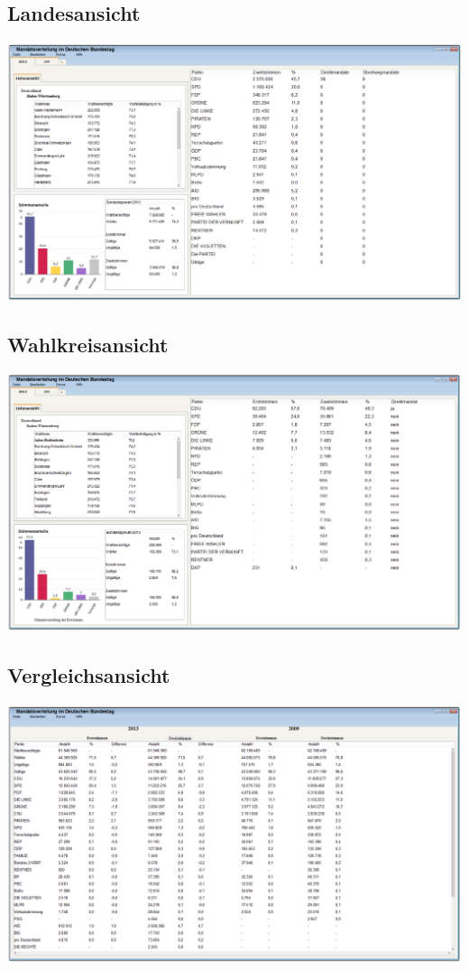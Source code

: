\documentclass[10pt,a4paper]{article}
\begin{document}
\subsection{Landesansicht}
\includegraphics[scale=0.3]{Landesansicht.png}
\newpage
\subsection{Wahlkreisansicht}
\includegraphics[scale=0.3]{Wahlkreisansicht.png}
\newpage
\subsection{Vergleichsansicht}
\includegraphics[scale=0.3]{Vergleichsansicht.png}
\newpage
\end{document}

